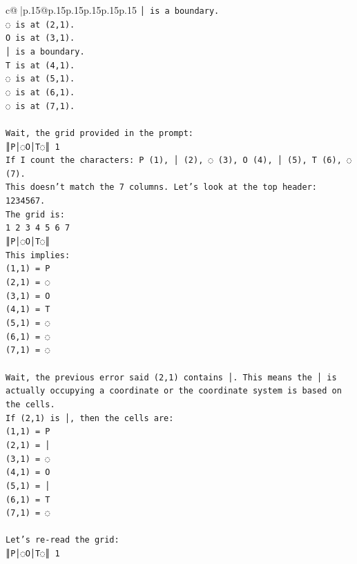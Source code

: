 \documentclass{article}
\begin{document}
{\begin{supertabular}{c@{$\;$}|p{.15\linewidth}@{}p{.15\linewidth}p{.15\linewidth}p{.15\linewidth}p{.15\linewidth}p{.15\linewidth}}
{{{\texttt{│ is a boundary.} \\
\texttt{◌ is at (2,1).} \\
\texttt{O is at (3,1).} \\
\texttt{│ is a boundary.} \\
\texttt{T is at (4,1).} \\
\texttt{◌ is at (5,1).} \\
\texttt{◌ is at (6,1).} \\
\texttt{◌ is at (7,1).} \\
\\ 
\texttt{Wait, the grid provided in the prompt:} \\
\texttt{║P│◌O│T◌║ 1} \\
\texttt{If I count the characters: P (1), │ (2), ◌ (3), O (4), │ (5), T (6), ◌ (7).} \\
\texttt{This doesn't match the 7 columns. Let's look at the top header: 1234567.} \\
\texttt{The grid is:} \\
\texttt{1 2 3 4 5 6 7} \\
\texttt{║P│◌O│T◌║} \\
\texttt{This implies:} \\
\texttt{(1,1) = P} \\
\texttt{(2,1) = ◌} \\
\texttt{(3,1) = O} \\
\texttt{(4,1) = T} \\
\texttt{(5,1) = ◌} \\
\texttt{(6,1) = ◌} \\
\texttt{(7,1) = ◌} \\
\\ 
\texttt{Wait, the previous error said (2,1) contains │. This means the │ is actually occupying a coordinate or the coordinate system is based on the cells.} \\
\texttt{If (2,1) is │, then the cells are:} \\
\texttt{(1,1) = P} \\
\texttt{(2,1) = │} \\
\texttt{(3,1) = ◌} \\
\texttt{(4,1) = O} \\
\texttt{(5,1) = │} \\
\texttt{(6,1) = T} \\
\texttt{(7,1) = ◌} \\
\\ 
\texttt{Let's re{-}read the grid:} \\
\texttt{║P│◌O│T◌║ 1} \\
}}}
\end{supertabular}}
\end{document}
